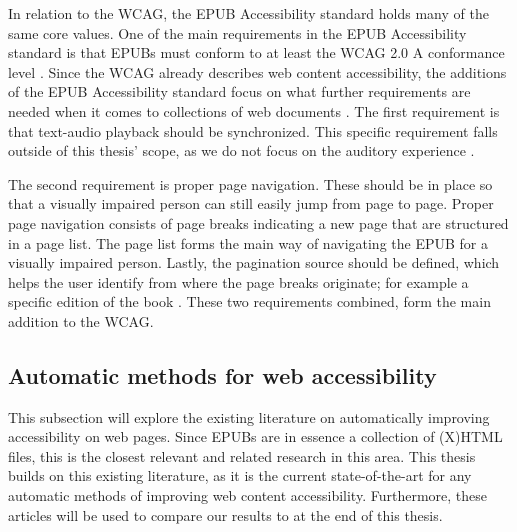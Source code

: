 In relation to the WCAG, the EPUB Accessibility standard holds many of the same core values. One of the main requirements in the EPUB Accessibility standard is that EPUBs must conform to at least the WCAG 2.0 A conformance level \cite{EPUBGuidelines}. Since the WCAG already describes web content accessibility, the additions of the EPUB Accessibility standard focus on what further requirements are needed when it comes to collections of web documents \cite{EPUBGuidelines}. The first requirement is that text-audio playback should be synchronized. This specific requirement falls outside of this thesis' scope, as we do not focus on the auditory experience \cite{EPUBGuidelines}. 

The second requirement is proper page navigation. These should be in place so that a visually impaired person can still easily jump from page to page. Proper page navigation consists of page breaks indicating a new page that are structured in a page list. The page list forms the main way of navigating the EPUB for a visually impaired person. Lastly, the pagination source should be defined, which helps the user identify from where the page breaks originate; for example a specific edition of the book \cite{EPUBGuidelines}. These two requirements combined, form the main addition to the WCAG.







\subsection{Automatic methods for web accessibility}
This subsection will explore the existing literature on automatically improving accessibility on web pages. Since EPUBs are in essence a collection of (X)HTML files, this is the closest relevant and related research in this area. This thesis builds on this existing literature, as it is the current state-of-the-art for any automatic methods of improving web content accessibility. Furthermore, these articles will be used to compare our results to at the end of this thesis.

